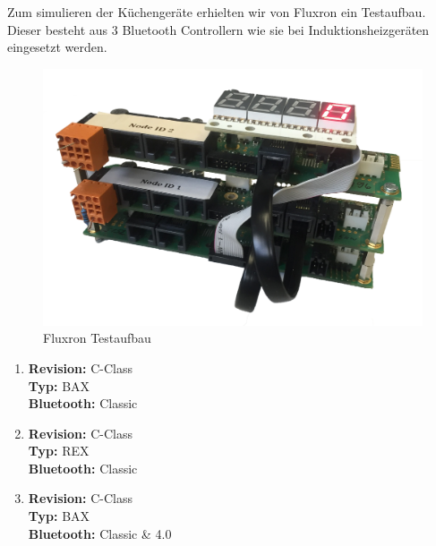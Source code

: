 Zum simulieren der Küchengeräte erhielten wir von Fluxron ein Testaufbau. Dieser besteht aus 3 Bluetooth Controllern wie sie bei Induktionsheizgeräten eingesetzt werden.

\begin{figure}
	\includegraphics[scale=0.1025]{appendix/res/fluxron_device_transparent}
	\caption{Fluxron Testaufbau}
\end{figure}

\begin{enumerate}
\item \textbf{Revision:} C-Class\\ \textbf{Typ:} BAX\\ \textbf{Bluetooth:} Classic
\item \textbf{Revision:} C-Class\\ \textbf{Typ:} REX\\ \textbf{Bluetooth:} Classic
\item \textbf{Revision:} C-Class\\ \textbf{Typ:} BAX\\ \textbf{Bluetooth:} Classic \& 4.0
\end{enumerate}

